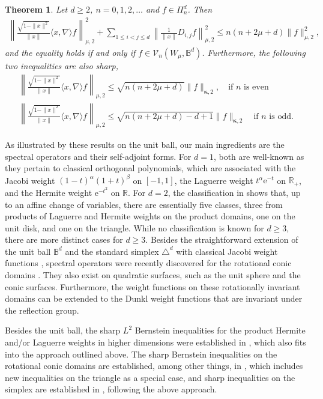 \documentclass{amsart}
\newtheorem{thm}{Theorem}[section]
\theoremstyle{remark}
\def\la{{\langle}}
\def\ra{{\rangle}}
\def\e{\mathrm{e}}
\def\a{{\alpha}}
\def\b{{\beta}}
\def\la{{\langle}}
\def\ra{{\rangle}}
\def\CV{{\mathcal V}}
\def\BB{{\mathbb B}}
\def\RR{{\mathbb R}}
\def\bk{{\boldsymbol{\kappa}}}
\begin{document}
\begin{thm} \label{thm:BInequality_new}
Let $d \ge 2$, $n = 0,1,2,\ldots$ and $f \in \Pi_n^d$. Then
\begin{align} \label{eq:BB-ineq1}
     \left \|\frac{\sqrt{1-\|x\|^2}}{\|x\|}  \la x ,\nabla \ra f\right \|_{\mu,2}^2
       +  \sum_{1\le i<j\le d} \left \| \frac{1}{\|x\|} D_{i,j} f \right\|_{\mu,2}^2 \le 
            n(n+2\mu+d) \|f\|_{\mu,2}^2,
\end{align}
and the equality holds if and only if $f \in \CV_n(W_\mu, \BB^d)$. Furthermore, the following two inequalities are also sharp,
\begin{align} 
\left \|\frac{\sqrt{1-\|x\|^2}}{\|x\|}  \la x ,\nabla \ra f\right \|_{\mu,2} \le \sqrt{n(n+2\mu+d)}  \|f\|_{\bk,2}, \quad \text{if $n$ is even} \label{eq:BB-ineq1a} \\
\left \|\frac{\sqrt{1-\|x\|^2}}{\|x\|}  \la x ,\nabla \ra f\right \|_{\mu,2} \le \sqrt{n(n+2\mu+d) -d+1}  \|f\|_{\bk,2} \quad \text{if $n$ is odd}. \label{eq:BB-ineq1b}
\end{align}
\end{thm}

As illustrated by these results on the unit ball, our main ingredients are the spectral operators and their self-adjoint forms.
For $d = 1$, both are well-known as they pertain to classical orthogonal polynomials, which are associated with the 
Jacobi weight $(1-t)^\a (1+t)^\b$ on $[-1,1]$, the Laguerre weight $t^\a \e^{-t}$ on $\RR_+$, and the Hermite
weight $\e^{-t^2}$ on $\RR$. For $d =2$, the classification in \cite{KrSh} shows that, up to an affine change of 
variables, there are essentially five classes, three from products of Laguerre and Hermite weights on the product 
domains, one on the unit disk, and one on the triangle. While no classification is known for $d \ge 3$, there are more 
distinct cases for $d \ge 3$. Besides the straightforward extension of the unit ball $\BB^d$ and the standard simplex 
$\triangle^d$ with classical Jacobi weight functions \cite{DX}, spectral operators were recently discovered for the 
rotational conic domains \cite{X21}. They also exist on quadratic surfaces, such as the unit sphere and the conic 
surfaces. Furthermore, the weight functions on these rotationally invariant domains can be extended to the Dunkl 
weight functions that are invariant under the reflection group. 

Besides the unit ball, the sharp $L^2$ Bernstein inequalities for the product Hermite and/or Laguerre weights 
in higher dimensions were established in \cite{KS}, which also fits into the approach outlined above. 
The sharp Bernstein inequalities on the rotational conic domains are established, among other things, 
in \cite{X23b}, which includes new inequalities on the triangle as a special case, and sharp inequalities on 
the simplex are established in \cite{GX}, following the above approach. 
\end{document}
